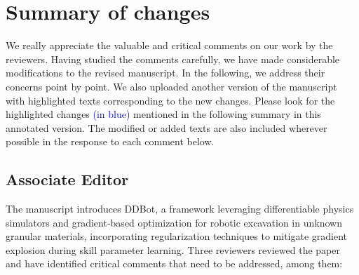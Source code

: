 \documentclass[11pt]{article}
\newcounter{reviewer}
\newcounter{point}[reviewer]
\newcommand{\reviewersection}{\stepcounter{reviewer} \bigskip \hrule
                  \section*{Reviewer \thereviewer}}
\newcommand{\xt}[1]{\textcolor{blue}{#1}}
\begin{document}
\section*{Summary of changes}
We really appreciate the valuable and critical comments on our work by the reviewers. 
Having studied the comments carefully, we have made considerable modifications to the revised manuscript. In the following, we address their concerns point by point. We also uploaded another version of the manuscript with highlighted texts corresponding to the new changes. Please look for the highlighted changes \xt{(in blue)} mentioned in the following summary in this annotated version. The modified or added texts are also included wherever possible in the response to each comment below.


\subsection*{Associate Editor}
The manuscript introduces DDBot, a framework leveraging differentiable physics simulators and gradient‐based optimization for robotic excavation in unknown granular materials, incorporating regularization techniques to mitigate gradient explosion during skill parameter learning. Three reviewers reviewed the paper and have identified critical comments that need to be addressed, among them:
\end{document}
